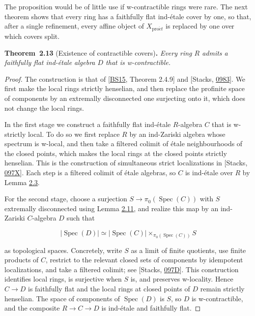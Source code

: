 \documentclass[11pt]{article}
\newenvironment{bpstatement}[2]{\par\addvspace{0.6\baselineskip}\noindent\textbf{#1}#2\textbf{.}\enspace\ignorespaces}
  {\par\addvspace{0.4\baselineskip}}
\newenvironment{bpstatementit}[2]{\begin{bpstatement}{#1}{#2}\itshape\ignorespaces}{\end{bpstatement}}
\begin{document}
\label{bp38}%
The proposition would be of little use if w-contractible rings were rare. The next theorem shows that every ring has a faithfully flat ind-étale cover by one, so that, after a single refinement, every affine object of \(X_{\mathrm{pro}\acute{e}t}\) is replaced by one over which covers split.

\label{bp39}%
\begin{bpstatementit}{Theorem~2.13}{ (Existence of contractible covers)}
Every ring \(R\) admits a faithfully flat ind-étale algebra \(D\) that is w-contractible.
\end{bpstatementit}

\begin{proof}[{Proof}]\label{bp40}%
The construction is that of [\hyperref[bp705]{BS15}, Theorem 2.4.9] and [Stacks, \href{https://stacks.math.columbia.edu/tag/0983}{0983}]. We first make the local rings strictly henselian, and then replace the profinite space of components by an extremally disconnected one surjecting onto it, which does not change the local rings.

In the first stage we construct a faithfully flat ind-étale \(R\)-algebra \(C\) that is w-strictly local. To do so we first replace \(R\) by an ind-Zariski algebra whose spectrum is w-local, and then take a filtered colimit of étale neighbourhoods of the closed points, which makes the local rings at the closed points strictly henselian. This is the construction of simultaneous strict localizations in [Stacks, \href{https://stacks.math.columbia.edu/tag/097X}{097X}]. Each step is a filtered colimit of étale algebras, so \(C\) is ind-étale over \(R\) by Lemma \hyperref[bp12]{2.3}.

For the second stage, choose a surjection \(S\to\pi_0(\operatorname{Spec}(C))\) with \(S\) extremally disconnected using Lemma \hyperref[bp33]{2.11}, and realize this map by an ind-Zariski \(C\)-algebra \(D\) such that

\[
|\operatorname{Spec}(D)|
\simeq |\operatorname{Spec}(C)|
\times_{\pi_0(\operatorname{Spec}(C))}S
\]

as topological spaces. Concretely, write \(S\) as a limit of finite quotients, use finite products of \(C\), restrict to the relevant closed sets of components by idempotent localizations, and take a filtered colimit; see [Stacks, \href{https://stacks.math.columbia.edu/tag/097D}{097D}]. This construction identifies local rings, is surjective when \(S\) is, and preserves w-locality. Hence \(C\to D\) is faithfully flat and the local rings at closed points of \(D\) remain strictly henselian. The space of components of \(\operatorname{Spec}(D)\) is \(S\), so \(D\) is w-contractible, and the composite \(R\to C\to D\) is ind-étale and faithfully flat.
\end{proof}
\end{document}
